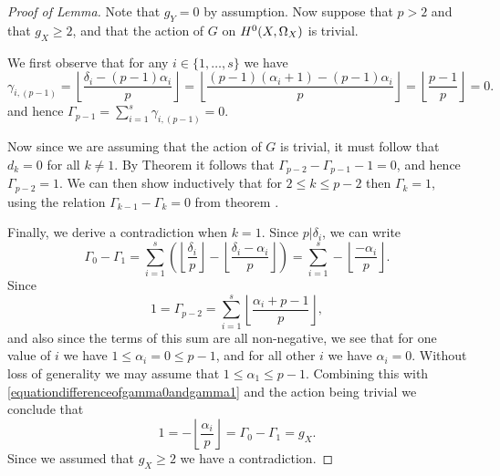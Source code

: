     \begin{proof}[Proof of Lemma]
    Note that $g_Y= 0$ by assumption.
    Now suppose that $p >2$ and that $g_X  \geq 2$, and that the action of $G$ on ${H^0(X,\Omega_X)}$ is trivial.
    
    We first observe that for any $i \in \{1, \ldots, s \}$ we have
        \[
        \gamma_{i, (p-1)} = \left \lfloor \frac{\delta_i - (p-1)\alpha_i}{p} \right \rfloor  = \left \lfloor \frac{(p-1)(\alpha_i + 1) - (p-1)\alpha_i}{p} \right \rfloor  = \left \lfloor \frac{p-1}{p} \right \rfloor = 0.
        \]  
    and hence $\Gamma_{p-1} = \sum_{ i=1}^s \gamma_{i, (p-1)} = 0$.

    Now since we are assuming that the action of $G$ is trivial, it must follow that $d_k = 0$ for all $k \neq 1$.
    By Theorem  it follows that $\Gamma_{p-2} - \Gamma_{p-1} -1 = 0$, and hence $\Gamma_{p-2} = 1$.
    We can then show inductively that for $2 \leq k \leq p-2$ then $\Gamma_k = 1$, using the relation $\Gamma_{k-1} - \Gamma_k = 0$ from theorem .

    Finally, we derive a contradiction when $k =1$.
    Since $p | \delta_i$, we can write 
        \begin{equation}\label{equationdifferenceofgamma0andgamma1}
        \Gamma_0  - \Gamma_1 = \sum_{i=1}^s \left( \left \lfloor \frac{\delta_i}{p} \right \rfloor - \left \lfloor \frac{\delta_i - \alpha_i}{p} \right \rfloor \right) = \sum_{i=1}^s -\left\lfloor \frac{-\alpha_i}{p} \right \rfloor.
        \end{equation}
    Since
        \[
        1 = \Gamma_{p-2} = \sum_{i=1}^s \left\lfloor \frac{\alpha_i + p -1}{p} \right \rfloor,
        \]
    and also since the terms of this sum are all non-negative, we see that for one value of $i$ we have $1 \leq \alpha_i=0 \leq p-1$, and for all other $i$ we have $\alpha_i = 0$.
    Without loss of generality we may assume that $ 1 \leq \alpha_1 \leq p-1$.
    Combining this with \eqref{equationdifferenceofgamma0andgamma1} and the action being trivial  we conclude that
        \[
        1 = - \left \lfloor \frac{\alpha_i}{p} \right \rfloor = \Gamma_0 - \Gamma_1 = g_X.
        \]  
    Since we assumed that $g_X \geq 2$ we have a contradiction.
    \end{proof}



